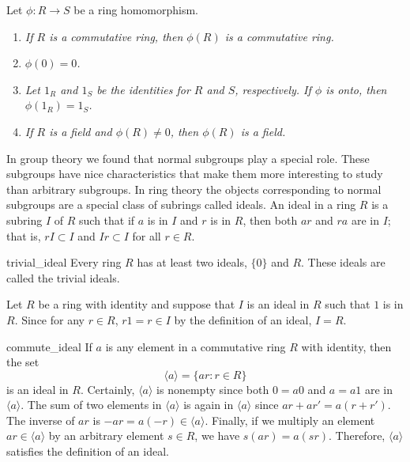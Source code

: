  
\begin{proposition}
Let $\phi : R \rightarrow S$ be a ring homomorphism.
\begin{enumerate}
 
\rm \item \it
If $R$ is a commutative ring, then $\phi(R)$ is a
commutative ring. 
 
\rm \item \it
$\phi( 0 ) = 0$. 
 
\rm \item \it
Let $1_R$ and $1_S$ be the identities for $R$ and $S$, respectively.
If $\phi$ is onto, then $\phi(1_R) = 1_S$.  
 
\rm \item \it
If $R$ is a field and $\phi(R) \neq 0$, then $\phi(R)$ is a field.
 
\end{enumerate}
\end{proposition}
 
 
In group theory we found that normal subgroups play a special role.
These subgroups have nice characteristics that make them more
interesting to study than arbitrary subgroups.  In ring theory the
objects corresponding to normal subgroups are a special class of
subrings called ideals. An {\bfi ideal\/}
in a ring $R$ is a subring $I$ of $R$ such that if $a$ is in $I$ and
$r$ is in $R$, then both $ar$ and $ra$ are in $I$; that is, $rI
\subset I$ and $Ir \subset I$ for all $r \in R$.  
 
 
\begin{example}{trivial_ideal}
Every ring $R$ has at least two ideals, $\{ 0 \}$ and $R$.  These
ideals are called the {\bfi trivial ideals}. 
\end{example}
 
 

 
 
Let $R$ be a ring with identity and suppose that $I$ is an ideal in
$R$ such that $1$ is in $R$. Since for any $r \in R$, $r1 = r \in 
I$ by the definition of an ideal, $I = R$.
 
 
\begin{example}{commute_ideal}
If $a$ is any element in a commutative ring $R$ with identity, then
the set   
\[
\langle a \rangle = \{ ar : r \in R \}
\]
is an ideal in $R$. Certainly, $\langle a \rangle$ is nonempty since both
$0 = a0$ and $a = a1$ are in $\langle a \rangle$. The
sum of two elements in $\langle a \rangle$ is again in $\langle a
\rangle$ since $ar + ar' =  a(r + r')$. The inverse of $ar$ is $-ar =
a (-r) \in \langle a \rangle$.  Finally, if we multiply an element $ar
\in \langle a \rangle$ by an arbitrary element $s \in R$, we have
$s(ar) = a(sr)$.  Therefore, $\langle a \rangle$ satisfies the
definition of an ideal. 
\end{example}
 
